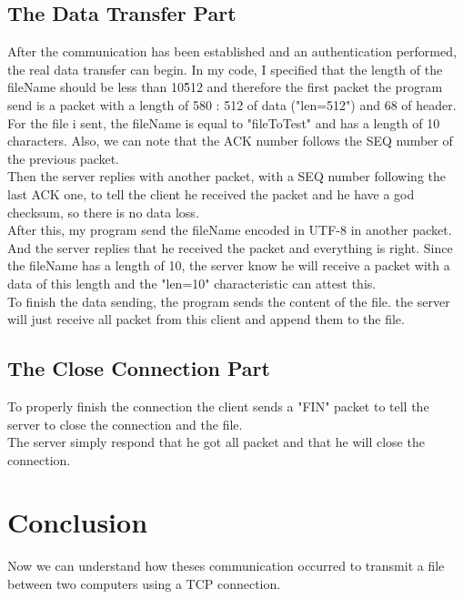 \documentclass[a4paper]{article}
\begin{document}
\subsection{The Data Transfer Part}

After the communication has been established and an authentication performed, the real data transfer can begin.
In my code, I specified that the length of the fileName should be less than 10\^512 and therefore the first packet the program send is a packet with a length of 580 : 512 of data ("len=512") and 68 of header. 
For the file i sent, the fileName is equal to "fileToTest" and has a length of 10 characters.
Also, we can note that the ACK number follows the SEQ number of the previous packet.
\\
Then the server replies with another packet, with a SEQ number following the last ACK one, to tell the client he received the packet and he have a god checksum, so there is no data loss.
\\
After this, my program send the fileName encoded in UTF-8 in another packet. And the server replies that he received the packet and everything is right. Since the fileName has a length of 10, the server know he will receive a packet with a data of this length and the "len=10" characteristic can attest this. 
\\
To finish the data sending, the program sends the content of the file. the server will just receive all packet from this client and append them to the file.

\subsection{The Close Connection Part}

To properly finish the connection the client sends a "FIN" packet to tell the server to close the connection and the file.
\\
The server simply respond that he got all packet and that he will close the connection.

\section{Conclusion}

Now we can understand how theses communication occurred to transmit a file between two computers using a TCP connection. 

\newpage
\listoffigures
\end{document}

